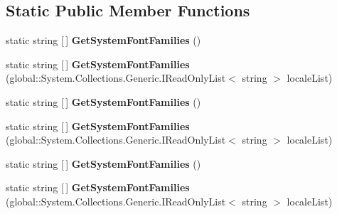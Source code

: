 \subsection*{Static Public Member Functions}
\begin{DoxyCompactItemize}
\item 
\mbox{\label{class_microsoft_1_1_graphics_1_1_canvas_1_1_text_1_1_canvas_text_format_aef2dd80c00156eb603c71c32191c2972}} 
static string \mbox{[}$\,$\mbox{]} {\bfseries Get\+System\+Font\+Families} ()
\item 
\mbox{\label{class_microsoft_1_1_graphics_1_1_canvas_1_1_text_1_1_canvas_text_format_a66c03578106f9f7b8f72955158707980}} 
static string \mbox{[}$\,$\mbox{]} {\bfseries Get\+System\+Font\+Families} (global\+::\+System.\+Collections.\+Generic.\+I\+Read\+Only\+List$<$ string $>$ locale\+List)
\item 
\mbox{\label{class_microsoft_1_1_graphics_1_1_canvas_1_1_text_1_1_canvas_text_format_aef2dd80c00156eb603c71c32191c2972}} 
static string \mbox{[}$\,$\mbox{]} {\bfseries Get\+System\+Font\+Families} ()
\item 
\mbox{\label{class_microsoft_1_1_graphics_1_1_canvas_1_1_text_1_1_canvas_text_format_a66c03578106f9f7b8f72955158707980}} 
static string \mbox{[}$\,$\mbox{]} {\bfseries Get\+System\+Font\+Families} (global\+::\+System.\+Collections.\+Generic.\+I\+Read\+Only\+List$<$ string $>$ locale\+List)
\item 
\mbox{\label{class_microsoft_1_1_graphics_1_1_canvas_1_1_text_1_1_canvas_text_format_aef2dd80c00156eb603c71c32191c2972}} 
static string \mbox{[}$\,$\mbox{]} {\bfseries Get\+System\+Font\+Families} ()
\item 
\mbox{\label{class_microsoft_1_1_graphics_1_1_canvas_1_1_text_1_1_canvas_text_format_a66c03578106f9f7b8f72955158707980}} 
static string \mbox{[}$\,$\mbox{]} {\bfseries Get\+System\+Font\+Families} (global\+::\+System.\+Collections.\+Generic.\+I\+Read\+Only\+List$<$ string $>$ locale\+List)

\end{DoxyCompactItemize}

